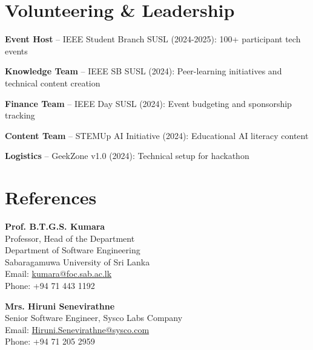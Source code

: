 \documentclass[letterpaper,10pt]{article}
\newenvironment{resume_list}{
  \vspace{-2pt}
  \begin{itemize}[itemsep=1pt, leftmargin=14pt]
}{
  \end{itemize}\vspace{-3pt}
}
\begin{document}
\section{Volunteering \& Leadership}
\vspace{-1pt}
\begin{resume_list}
  \item \textbf{Event Host} – IEEE Student Branch SUSL (2024-2025): 100+ participant tech events
  \item \textbf{Knowledge Team} – IEEE SB SUSL (2024): Peer-learning initiatives and technical content creation
  \item \textbf{Finance Team} – IEEE Day SUSL (2024): Event budgeting and sponsorship tracking
  \item \textbf{Content Team} – STEMUp AI Initiative (2024): Educational AI literacy content
  \item \textbf{Logistics} – GeekZone v1.0 (2024): Technical setup for hackathon
\end{resume_list}

\vspace{-2pt}
\section{References}
\vspace{-1pt}

\textbf{Prof. B.T.G.S. Kumara}\\
Professor, Head of the Department\\
Department of Software Engineering\\
Sabaragamuwa University of Sri Lanka\\
Email: \href{mailto:kumara@foc.sab.ac.lk}{kumara@foc.sab.ac.lk}\\
Phone: +94 71 443 1192

\vspace{3pt}
\textbf{Mrs. Hiruni Senevirathne}\\
Senior Software Engineer, Sysco Labs Company\\
Email: \href{mailto:Hiruni.Senevirathne@sysco.com}{Hiruni.Senevirathne@sysco.com}\\
Phone: +94 71 205 2959
\end{document}
